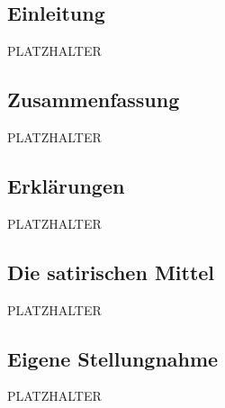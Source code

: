 \documentclass[12pt,a4paper]{scrartcl}
\begin{document}
\subsection{Einleitung} 
PLATZHALTER


\subsection{Zusammenfassung} 
PLATZHALTER


\subsection{Erklärungen} 
PLATZHALTER


\subsection{Die satirischen Mittel} 
PLATZHALTER


\subsection{Eigene Stellungnahme} 
PLATZHALTER


\end{document}
